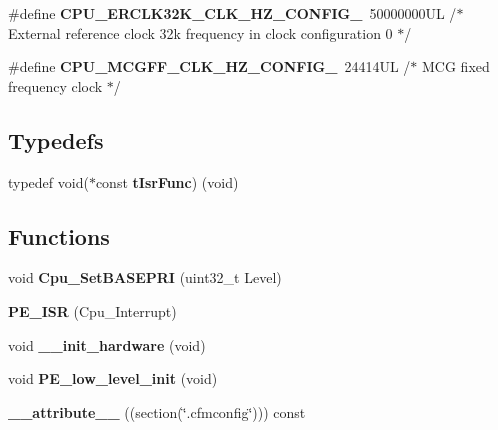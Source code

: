 \begin{DoxyCompactItemize}
\item 
\hypertarget{group___cpu__module_ga092702a75fd1041eb311850abb022240}{}\#define {\bfseries C\+P\+U\+\_\+\+E\+R\+C\+L\+K32\+K\+\_\+\+C\+L\+K\+\_\+\+H\+Z\+\_\+\+C\+O\+N\+F\+I\+G\+\_}~50000000\+U\+L /$\ast$ External reference clock 32k frequency in clock configuration 0 $\ast$/\label{group___cpu__module_ga092702a75fd1041eb311850abb022240}

\item 
\hypertarget{group___cpu__module_gafd8ec2ac4ea47574f95d0e5a6f80807e}{}\#define {\bfseries C\+P\+U\+\_\+\+M\+C\+G\+F\+F\+\_\+\+C\+L\+K\+\_\+\+H\+Z\+\_\+\+C\+O\+N\+F\+I\+G\+\_}~24414\+U\+L /$\ast$ M\+C\+G fixed frequency clock $\ast$/\label{group___cpu__module_gafd8ec2ac4ea47574f95d0e5a6f80807e}

\end{DoxyCompactItemize}
\subsection*{Typedefs}
\begin{DoxyCompactItemize}
\item 
\hypertarget{group___cpu__module_gafea04d3e8135767c03ce099f02e97437}{}typedef void($\ast$const {\bfseries t\+Isr\+Func}) (void)\label{group___cpu__module_gafea04d3e8135767c03ce099f02e97437}

\end{DoxyCompactItemize}
\subsection*{Functions}
\begin{DoxyCompactItemize}
\item 
\hypertarget{group___cpu__module_ga0ee0366b566c5a7b6088ef899c4d19a7}{}void {\bfseries Cpu\+\_\+\+Set\+B\+A\+S\+E\+P\+R\+I} (uint32\+\_\+t Level)\label{group___cpu__module_ga0ee0366b566c5a7b6088ef899c4d19a7}

\item 
\hypertarget{group___cpu__module_gafa0067fa0d355a26ca9894983c01be6f}{}{\bfseries P\+E\+\_\+\+I\+S\+R} (Cpu\+\_\+\+Interrupt)\label{group___cpu__module_gafa0067fa0d355a26ca9894983c01be6f}

\item 
\hypertarget{group___cpu__module_ga32a8d86789a3326b3120bf1e1c1d4252}{}void {\bfseries \+\_\+\+\_\+init\+\_\+hardware} (void)\label{group___cpu__module_ga32a8d86789a3326b3120bf1e1c1d4252}

\item 
\hypertarget{group___cpu__module_ga95039f54c45f24c1b4ed640fa2f63f11}{}void {\bfseries P\+E\+\_\+low\+\_\+level\+\_\+init} (void)\label{group___cpu__module_ga95039f54c45f24c1b4ed640fa2f63f11}

\item 
\hypertarget{group___cpu__module_ga2d9b5b981f451cdf47bf43b4f9cc9e03}{}{\bfseries \+\_\+\+\_\+attribute\+\_\+\+\_\+} ((section(\char`\"{}.cfmconfig\char`\"{}))) const\label{group___cpu__module_ga2d9b5b981f451cdf47bf43b4f9cc9e03}

\end{DoxyCompactItemize}
